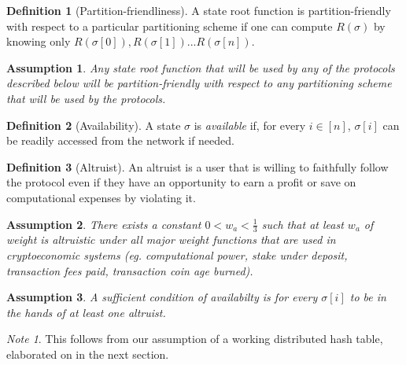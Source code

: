 \documentclass[11pt,a4paper]{report}
\theoremstyle{plain}
\newtheorem{assm}{Assumption}[chapter]
\theoremstyle{definition}
\newtheorem{defn}{Definition}[chapter]
\theoremstyle{remark}
\newtheorem*{note}{Note}
\begin{document}
\begin{defn}[Partition-friendliness]
A state root function is partition-friendly with respect to a particular partitioning scheme if one can compute $R(\sigma)$ by knowing only $R(\sigma[0]), R(\sigma[1]) ... R(\sigma[n])$. 
\end{defn}

\begin{assm}
Any state root function that will be used by any of the protocols described below will be partition-friendly with respect to any partitioning scheme that will be used by the protocols.
\end{assm}

\begin{defn}[Availability]
A state $\sigma$ is \emph{available} if, for every $i \in [n]$, $\sigma[i]$ can be readily accessed from the network if needed.
\end{defn}

\begin{defn}[Altruist]
An altruist is a user that is willing to faithfully follow the protocol even if they have an opportunity to earn a profit or save on computational expenses by violating it.
\end{defn}

\begin{assm}
There exists a constant $0 < w_a < \frac{1}{3}$ such that at least $w_a$ of weight is altruistic under all major weight functions that are used in cryptoeconomic systems (eg. computational power, stake under deposit, transaction fees paid, transaction coin age burned).
\end{assm}

\begin{assm}
A sufficient condition of availabilty is for every $\sigma[i]$ to be in the hands of at least one altruist.
\end{assm}

\begin{note}
This follows from our assumption of a working distributed hash table, elaborated on in the next section.
\end{note}
\end{document}
